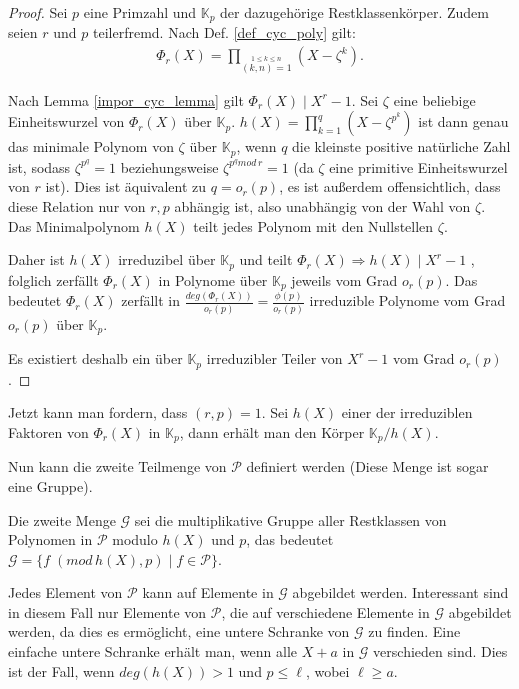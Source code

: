 \documentclass[12pt,oneside]{article}
\theoremstyle{remark}
\theoremstyle{definition}
\begin{document}
\begin{flushleft}
\begin{proof}
    Sei $p$ eine Primzahl und $\mathbb{K}_{p}$ der dazugehörige Restklassenkörper. Zudem seien $r$ und $p$ teilerfremd. Nach Def. \ref{def_cyc_poly} gilt: 
    \begin{align*}\label{rth_cy}
        \Phi _{r}(X)=\prod _{\stackrel {1\leq k\leq n}{(k,n)=1}}\left(X- \zeta^k\right).
    \end{align*}
    
Nach Lemma \ref{impor_cyc_lemma} gilt $\Phi_{r}(X) \mid  X^{r} - 1$. Sei $\zeta$ eine beliebige Einheitswurzel von $\Phi_r(X)$  über $\mathbb{K}_p$. $h(X) = \prod_{k = 1}^{q} (X - \zeta^{p^k})$ ist dann genau das minimale Polynom von $\zeta$ über $\mathbb{K}_p$, wenn $q$ die kleinste positive natürliche Zahl ist, sodass $\zeta^{p^q} = 1$ beziehungsweise $\zeta^{p^q mod \, r} = 1$ (da $\zeta$ eine primitive Einheitswurzel von $r$ ist). Dies ist äquivalent zu $q = o_r(p)$, es ist außerdem offensichtlich, dass diese Relation nur von $r,p$ abhängig ist, also unabhängig von der Wahl von $\zeta$. Das Minimalpolynom $h(X)$ teilt jedes Polynom mit den Nullstellen $\zeta$.

Daher ist $h(X)$ irreduzibel über $\mathbb{K}_p$ und teilt $\Phi_{r}(X) \Rightarrow h(X) \mid X^r - 1$ , folglich zerfällt $\Phi_r(X)$ in Polynome über $\mathbb{K}_p$ jeweils vom Grad $o_r(p)$. Das bedeutet $\Phi_{r}(X)$ zerfällt in $\frac{deg(\Phi_{r}(X))}{o_r(p)} = \frac{\phi(p)}{o_r(p)}$ irreduzible Polynome vom Grad $o_r(p)$ über $\mathbb{K}_p$.

Es existiert deshalb ein über $\mathbb{K}_p$ irreduzibler Teiler von $X^r - 1$ vom Grad $o_r(p)$.              
\end{proof}

Jetzt kann man fordern, dass $(r,p) = 1$. Sei $h(X)$ einer der irreduziblen Faktoren von $\Phi_{r}(X)$ in $\mathbb{K}_p$, dann erhält man den Körper $\mathbb{K}_p/h(X)$.

Nun kann die zweite Teilmenge von $\mathcal{P}$ definiert werden (Diese Menge ist sogar eine Gruppe).\newline


Die zweite Menge $\mathcal{G}$ sei die multiplikative Gruppe aller Restklassen von Polynomen in $\mathcal{P}$ modulo $h(X)$ und $p$, das bedeutet $\mathcal{G} = \{f \; (mod \, h(X), p) \mid f \in \mathcal{P} \}$.\newline

Jedes Element von $\mathcal{P}$ kann auf Elemente in $\mathcal{G}$ abgebildet werden. Interessant sind in diesem Fall nur Elemente von $\mathcal{P}$, die auf verschiedene Elemente in $\mathcal{G}$ abgebildet werden, da dies es ermöglicht, eine untere Schranke von $\mathcal{G}$ zu finden. Eine einfache untere Schranke erhält man, wenn alle $X + a$ in $\mathcal{G}$ verschieden sind. Dies ist der Fall, wenn $deg(h(X)) > 1$ und $p \leq \ell$, wobei $\ell \geq a$.


\end{flushleft}
\end{document}
